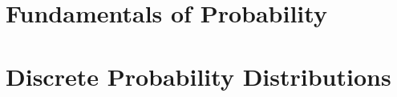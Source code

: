 \documentclass[british,11pt,a4paper]{report}
\begin{document}
\maketitle
\tableofcontents
\chapter{Fundamentals of Probability}

\chapter{Discrete Probability Distributions}

\end{document}
